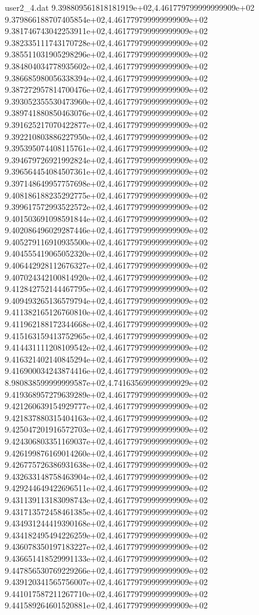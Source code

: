 \begin{filecontents}{user2_4.dat}
9.398809561818181919e+02,4.461779799999999909e+02
9.379866188707405854e+02,4.461779799999999909e+02
9.381746743042253911e+02,4.461779799999999909e+02
9.382335111743170728e+02,4.461779799999999909e+02
9.385511031905298296e+02,4.461779799999999909e+02
9.384804034778935602e+02,4.461779799999999909e+02
9.386685980056338394e+02,4.461779799999999909e+02
9.387272957814700476e+02,4.461779799999999909e+02
9.393052355530473960e+02,4.461779799999999909e+02
9.389741880850463076e+02,4.461779799999999909e+02
9.391625217070422877e+02,4.461779799999999909e+02
9.392210803886227950e+02,4.461779799999999909e+02
9.395395074408115761e+02,4.461779799999999909e+02
9.394679726921992824e+02,4.461779799999999909e+02
9.396564454084507361e+02,4.461779799999999909e+02
9.397148649957757698e+02,4.461779799999999909e+02
9.408186188235292775e+02,4.461779799999999909e+02
9.399617572993522572e+02,4.461779799999999909e+02
9.401503691098591844e+02,4.461779799999999909e+02
9.402086496029287446e+02,4.461779799999999909e+02
9.405279116910935500e+02,4.461779799999999909e+02
9.404555419065052320e+02,4.461779799999999909e+02
9.406442928112676327e+02,4.461779799999999909e+02
9.407024342100814920e+02,4.461779799999999909e+02
9.412842752144467795e+02,4.461779799999999909e+02
9.409493265136579794e+02,4.461779799999999909e+02
9.411382165126760810e+02,4.461779799999999909e+02
9.411962188172344668e+02,4.461779799999999909e+02
9.415163159413752965e+02,4.461779799999999909e+02
9.414431111208109542e+02,4.461779799999999909e+02
9.416321402140845294e+02,4.461779799999999909e+02
9.416900034243874416e+02,4.461779799999999909e+02
8.980838599999999587e+02,4.741635699999999929e+02
9.419368957279639289e+02,4.461779799999999909e+02
9.421260639154929777e+02,4.461779799999999909e+02
9.421837880315404163e+02,4.461779799999999909e+02
9.425047201916572703e+02,4.461779799999999909e+02
9.424306803351169037e+02,4.461779799999999909e+02
9.426199876169014260e+02,4.461779799999999909e+02
9.426775726386931638e+02,4.461779799999999909e+02
9.432633148758463904e+02,4.461779799999999909e+02
9.429244649422696511e+02,4.461779799999999909e+02
9.431139113183098743e+02,4.461779799999999909e+02
9.431713572458461385e+02,4.461779799999999909e+02
9.434931244419390168e+02,4.461779799999999909e+02
9.434182495494226259e+02,4.461779799999999909e+02
9.436078350197183227e+02,4.461779799999999909e+02
9.436651418529991133e+02,4.461779799999999909e+02
9.447856530769229266e+02,4.461779799999999909e+02
9.439120341565756007e+02,4.461779799999999909e+02
9.441017587211267710e+02,4.461779799999999909e+02
9.441589264601520881e+02,4.461779799999999909e+02

\end{filecontents}
